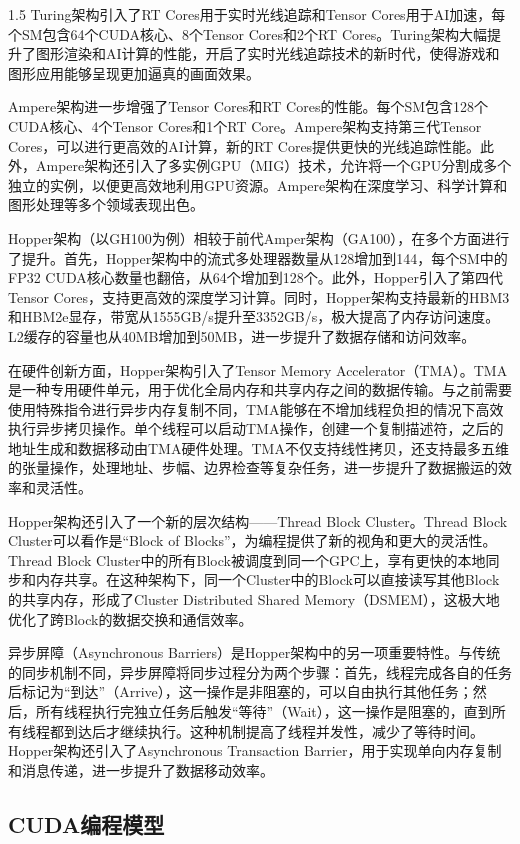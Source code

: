 \documentclass[zihao=-4]{ctexart}
\begin{document}
\begin{spacing}{1.5}
Turing架构引入了RT Cores用于实时光线追踪和Tensor Cores用于AI加速，每个SM包含64个CUDA核心、8个Tensor Cores和2个RT Cores。Turing架构大幅提升了图形渲染和AI计算的性能，开启了实时光线追踪技术的新时代，使得游戏和图形应用能够呈现更加逼真的画面效果。

Ampere架构进一步增强了Tensor Cores和RT Cores的性能。每个SM包含128个CUDA核心、4个Tensor Cores和1个RT Core。Ampere架构支持第三代Tensor Cores，可以进行更高效的AI计算，新的RT Cores提供更快的光线追踪性能。此外，Ampere架构还引入了多实例GPU（MIG）技术，允许将一个GPU分割成多个独立的实例，以便更高效地利用GPU资源。Ampere架构在深度学习、科学计算和图形处理等多个领域表现出色。

Hopper架构（以GH100为例）相较于前代Amper架构（GA100），在多个方面进行了提升。首先，Hopper架构中的流式多处理器数量从128增加到144，每个SM中的FP32 CUDA核心数量也翻倍，从64个增加到128个。此外，Hopper引入了第四代Tensor Cores，支持更高效的深度学习计算。同时，Hopper架构支持最新的HBM3和HBM2e显存，带宽从1555GB/s提升至3352GB/s，极大提高了内存访问速度。L2缓存的容量也从40MB增加到50MB，进一步提升了数据存储和访问效率。

在硬件创新方面，Hopper架构引入了Tensor Memory Accelerator（TMA）。TMA是一种专用硬件单元，用于优化全局内存和共享内存之间的数据传输。与之前需要使用特殊指令进行异步内存复制不同，TMA能够在不增加线程负担的情况下高效执行异步拷贝操作。单个线程可以启动TMA操作，创建一个复制描述符，之后的地址生成和数据移动由TMA硬件处理。TMA不仅支持线性拷贝，还支持最多五维的张量操作，处理地址、步幅、边界检查等复杂任务，进一步提升了数据搬运的效率和灵活性。

Hopper架构还引入了一个新的层次结构——Thread Block Cluster。Thread Block Cluster可以看作是“Block of Blocks”，为编程提供了新的视角和更大的灵活性。Thread Block Cluster中的所有Block被调度到同一个GPC上，享有更快的本地同步和内存共享。在这种架构下，同一个Cluster中的Block可以直接读写其他Block的共享内存，形成了Cluster Distributed Shared Memory（DSMEM），这极大地优化了跨Block的数据交换和通信效率。

异步屏障（Asynchronous Barriers）是Hopper架构中的另一项重要特性。与传统的同步机制不同，异步屏障将同步过程分为两个步骤：首先，线程完成各自的任务后标记为“到达”（Arrive），这一操作是非阻塞的，可以自由执行其他任务；然后，所有线程执行完独立任务后触发“等待”（Wait），这一操作是阻塞的，直到所有线程都到达后才继续执行。这种机制提高了线程并发性，减少了等待时间。Hopper架构还引入了Asynchronous Transaction Barrier，用于实现单向内存复制和消息传递，进一步提升了数据移动效率。

\subsection{CUDA编程模型}


\end{spacing}
\end{document}
